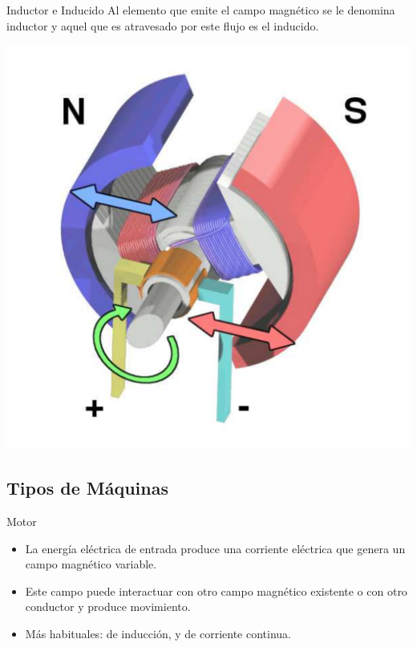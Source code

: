 \documentclass[xcolor={usenames,svgnames,dvipsnames}]{beamer}
\begin{document}
\begin{frame}[label={sec:org613bf83}]{Inductor e Inducido}
Al elemento que emite el campo magnético se le denomina \alert{inductor} y aquel que es atravesado por este flujo es el \alert{inducido}.
\begin{center}
\includegraphics[height=0.5\textheight]{../figs/Electric_motor_cycle_3.pdf}
\end{center}
\end{frame}

\subsection{Tipos de Máquinas}
\label{sec:org6a30912}

\begin{frame}[label={sec:org03e9873}]{Motor}
\begin{itemize}
\item La energía eléctrica de entrada produce una corriente eléctrica que genera un campo magnético variable.
\item Este campo puede interactuar con otro campo magnético existente o con otro conductor y produce movimiento.
\item Más habituales: de inducción, y de corriente continua.
\end{itemize}
\end{frame}
\end{document}
